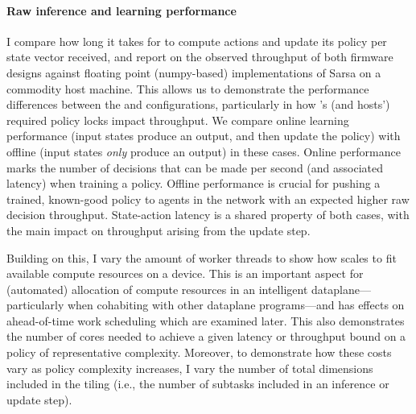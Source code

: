 \paragraph{Raw inference and learning performance}
I compare how long it takes for \approachshort{} to compute actions and update its policy per state vector received, and report on the observed throughput of both firmware designs against floating point (numpy-based) implementations of Sarsa on a commodity host machine.
This allows us to demonstrate the performance differences between the \indfw{} and \coopfw{} configurations, particularly in how \indfw's (and hosts') required policy locks impact throughput.
We compare online learning performance (input states produce an output, and then update the policy) with offline (input states \emph{only} produce an output) in these cases.
Online performance marks the number of decisions that can be made per second (and associated latency) when training a policy.
Offline performance is crucial for pushing a trained, known-good policy to agents in the network with an expected higher raw decision throughput.
State-action latency is a shared property of both cases, with the main impact on throughput arising from the update step.

Building on this, I vary the amount of worker threads to show how \approachshort{} scales to fit available compute resources on a device.
This is an important aspect for (automated) allocation of compute resources in an intelligent dataplane---particularly when cohabiting with other dataplane programs---and has effects on ahead-of-time work scheduling which are examined later.
This also demonstrates the number of cores needed to achieve a given latency or throughput bound on a policy of representative complexity.
Moreover, to demonstrate how these costs vary as policy complexity increases, I vary the number of total dimensions included in the tiling (i.e., the number of subtasks included in an inference or update step).%

